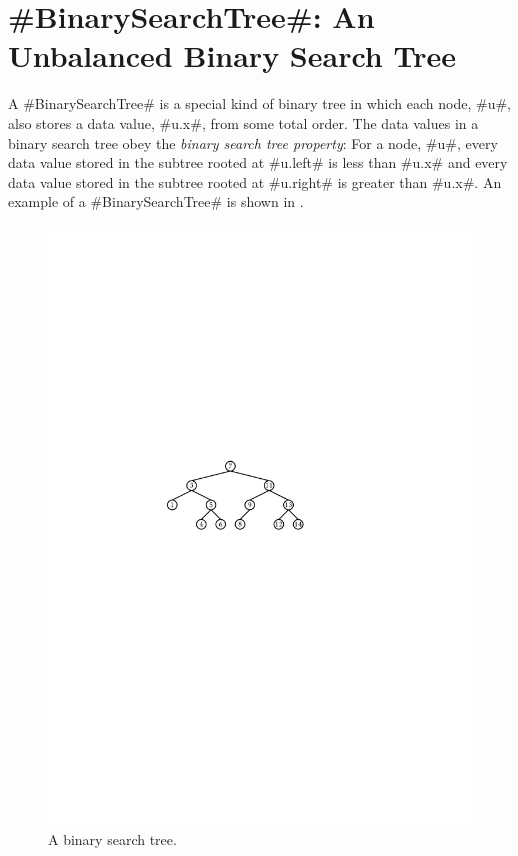 \section{#BinarySearchTree#: An Unbalanced Binary Search Tree}

%
%
%
A #BinarySearchTree# is a special kind of binary tree in which each node, #u#,
also stores a data value, #u.x#, from some total order.  The data values in
a binary search tree obey the \emph{binary search tree property}:
%
For
a node, #u#, every data value stored in the subtree rooted at #u.left#
is less than #u.x# and every data value stored in the subtree rooted at
#u.right# is greater than #u.x#.  An example of a #BinarySearchTree# is shown in .

\begin{figure}
  \begin{center}
    \includegraphics[scale=0.90909]{figs/bst-example}
  \end{center}
  \caption{A binary search tree.}
\end{figure}


